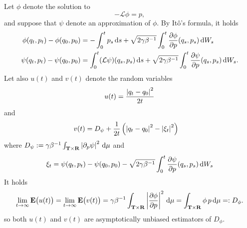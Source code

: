 \documentclass[11pt,a4paper]{article}
\newcommand{\expect}[0]{\mathbf{E}}
\newcommand{\real}{\mathbf R}
\newcommand{\torus}{\mathbf T}
\renewcommand{\d}{\mathrm d}
\theoremstyle{plain}
\numberwithin{equation}{section}
\begin{document}
Let $\phi$ denote the solution to
\[
    - \mathcal L \phi = p,
\]
and suppose that $\psi$ denote an approximation of $\phi$.
By It\^o's formula, it holds
\begin{align}
    \notag
    \phi(q_t, p_t) - \phi(q_0, p_0) &= - \int_{0}^{t} p_s \, \d s + \sqrt{2 \gamma \beta^{-1}} \int_{0}^{t} \derivative{1}[\phi]{p}(q_s, p_s) \, \d W_s \\
    \label{eq:ito_control}
    \psi(q_t, p_t) - \psi(q_0, p_0) &= \int_{0}^{t} (\mathcal L \psi) (q_s, p_s) \, \d s + \sqrt{2 \gamma \beta^{-1}} \int_{0}^{t} \derivative{1}[\psi]{p}(q_s, p_s) \, \d W_s.
\end{align}
Let also $u(t)$ and $v(t)$ denote the random variables
\begin{equation}
    \label{eq:simple_estimator}
    u(t) = \frac{\abs{q_t - q_0}^2}{2t}
\end{equation}
and
\begin{align*}
    v(t) &= D_{\psi}+ \frac{1}{2t} \left( \abs{q_t - q_0}^2 - \abs{\xi_t}^2\right)
\end{align*}
where $D_{\psi} := \gamma \beta^{-1} \int_{\torus \times \real} \abs{\derivative{1}[\psi]{p}}^2 \, \d \mu$ and
 \[
    \xi_t = \psi(q_t, p_t) - \psi(q_0, p_0) - \sqrt{2 \gamma \beta^{-1}} \int_{0}^{t} \derivative{1}[\psi]{p}(q_s, p_s) \, \d W_s
 \]
It holds
\[
    \lim_{t \to \infty} \expect \bigl( u(t) \bigr) = \lim_{t \to \infty} \expect \bigl( v(t) \bigr)
    = \gamma \beta^{-1} \int_{\torus \times \real} \abs{\derivative{1}[\phi]{p}}^2 \, \d \mu
    = \int_{\torus \times \real} \phi \, p \, \d \mu =: D_{\phi}.
\]
so both $u(t)$ and $v(t)$ are asymptotically unbiased estimators of $D_{\phi}$.
\end{document}
